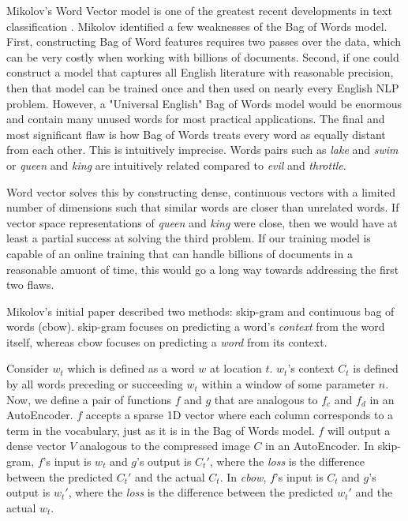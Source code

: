 \par{
Mikolov's Word Vector model is one of the greatest recent developments in text classification \cite{word2vec}. Mikolov identified a few weaknesses of the Bag of Words model. First, constructing Bag of Word features requires two passes over the data, which can be very costly when working with billions of documents. Second, if one could construct a model that captures all English literature with reasonable precision, then that model can be trained once and then used on nearly every English NLP problem. However, a "Universal English" Bag of Words model would be enormous and contain many unused words for most practical applications. The final and most significant flaw is how Bag of Words treats every word as equally distant from each other. This is intuitively imprecise. Words pairs such as \textit{lake} and \textit{swim} or \textit{queen} and \textit{king} are intuitively related compared to \textit{evil} and \textit{throttle}.
}

\par{
Word vector solves this by constructing dense, continuous vectors with a limited number of dimensions such that similar words are closer than unrelated words. If vector space representations of \textit{queen} and \textit{king} were close, then we would have at least a partial success at solving the third problem. If our training model is capable of an online training that can handle billions of documents in a reasonable amuont of time, this would go a long way towards addressing the first two flaws.
}

\par{
Mikolov's initial paper described two methods: \textsf{skip-gram} and \textsf{continuous bag of words (cbow)}. \textsf{skip-gram} focuses on predicting a word's \textit{context} from the word itself, whereas \textsf{cbow} focuses on predicting a \textit{word} from its context. 
}

\par{
Consider $w_t$ which is defined as a word $w$ at location $t$. $w_t$'s context $C_t$ is defined by all words preceding or succeeding $w_t$ within a window of some parameter $n$. Now, we define a pair of functions $f$ and $g$ that are analogous to $f_c$ and $f_d$ in an AutoEncoder. $f$ accepts a sparse 1D vector where each column corresponds to a term in the vocabulary, just as it is in the Bag of Words model. $f$ will output a dense vector $V$ analogous to the compressed image $C$ in an AutoEncoder. In \textsf{skip-gram}, $f$'s input is $w_t$ and $g$'s output is $C_t'$, where the \textit{loss} is the difference between the predicted $C_t'$ and the actual $C_t$. In \textit{cbow}, $f$'s input is $C_t$ and $g$'s output is $w_t'$, where the \textit{loss} is the difference between the predicted $w_t'$ and the actual $w_t$. 
}


